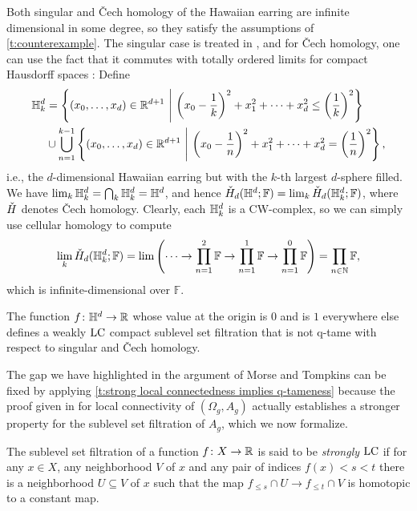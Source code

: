 Both singular and \v{C}ech homology of the Hawaiian earring are infinite dimensional in some degree, so they satisfy the assumptions of \cref{t:counterexample}.
The singular case is treated in \cite{Barratt.1962}, and for \v{C}ech homology, one can use the fact that it commutes with totally ordered limits for compact Hausdorff spaces \cite[Theorems VIII.3.6.\@ and X.3.1.]{Eilenberg.1952}:
Define 
\begin{align*}
\HE_k &=
\left\{ (x_0, \dots, x_d) \in \R^{d+1} \ \middle| \ \left( x_0 - \frac{1}{k} \right)^2 + x_1^2 + \dots + x_d^2 \leq \left( \frac{1}{k} \right)^2 \right\} \\ &\cup
\bigcup_{n=1}^{k-1} \left\{ (x_0, \dots, x_d) \in \R^{d+1} \ \middle |\ \left( x_0 - \frac{1}{n} \right)^2 + x_1^2 + \dots + x_d^2 = \left( \frac{1}{n} \right)^2 \right\},
\end{align*}
i.e., the $d$-dimensional Hawaiian earring but with the $k$-th largest $d$-sphere filled.
We have $\lim_{k} \mathbb{H}^d_{k} = \bigcap_{k} \mathbb{H}^d_{k} = \mathbb{H}^d$, and hence $\check{H}_{d}(\mathbb{H}^d; \mathbb{F}) = \lim_{k} \check{H}_{d}(\mathbb{H}^d_{k}; \mathbb{F})$, where $\check{H}$ denotes \v{C}ech homology.
Clearly, each $\mathbb{H}^d_{k}$ is a CW-complex, so we can simply use cellular homology to compute
\begin{equation*}
\lim_{k}\check{H}_{d}(\mathbb{H}^{d}_{k}; \mathbb{F})=\lim\left(\dots\to \prod_{n=1}^2\mathbb{F}\to \prod_{n=1}^1\mathbb{F}\to \prod_{n=1}^0\mathbb{F}\right)=\prod_{n\in\mathbb{N}}\mathbb{F},
\end{equation*}
which is infinite-dimensional over $\mathbb{F}$.

\begin{cor} \label{c: counterexample}
	The function $f \colon \mathbb{H}^d \to \mathbb{R}$ whose value at the origin is $0$ and is $1$ everywhere else defines a weakly $\mathrm{LC}$ compact sublevel set filtration that is not q-tame with respect to singular and \v{C}ech homology.
\end{cor}

The gap we have highlighted in the argument of Morse and Tompkins can be fixed by applying \cref{t:strong local connectedness implies q-tameness} because the proof given in \cite[p.464]{Morse.1939} for local connectivity of $(\Omega_g, A_g)$ actually establishes a stronger property for the sublevel set filtration of $A_g$, which we now formalize.

\begin{defi}
	The sublevel set filtration of a function $f \colon X \to \mathbb{R}$ is said to be \emph{strongly} $\mathrm{LC}$ if for any $x \in X$, any neighborhood $V$ of $x$ and any pair of indices $f(x) < s < t$ there is a neighborhood $U \subseteq V$ of $x$ such that the map $f_{\leq s} \cap U \to f_{\leq t} \cap V$ is homotopic to a constant map.
\end{defi}


